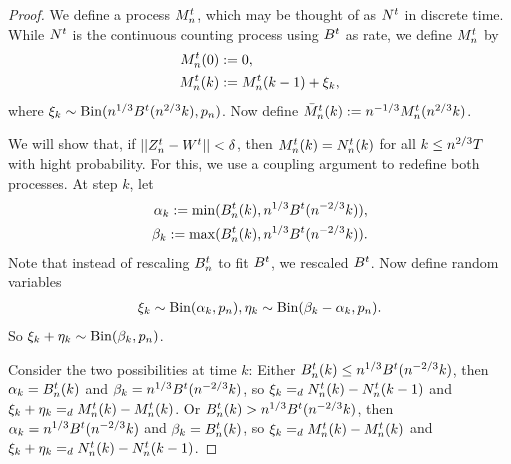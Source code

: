 \begin{proof}
We define a process $M_n^t$, which may be thought of as $N^t$ in discrete time.
While $N^t$ is the continuous counting process using $B^t$ as rate,
we define $M_n^t$ by
\begin{equation}
\begin{aligned}
M_n^t(0) &:= 0, \\
M_n^t(k) &:= M_n^t(k-1) + \xi_k, 
\end{aligned}
\end{equation}
where $\xi_k \sim \operatorname*{Bin}(n^{1 / 3}B^t(n^{2 / 3}k), p_n)$.
Now define $\bar{M}_n^t(k) := n^{-1 / 3} M_n^t(n^{2 / 3}k)$.

We will show that, if $||Z_n^t - W^t|| < \delta$, 
then $M_n^t(k) = N_n^t(k)$ for all $k \leq n^{2 / 3}T$ with hight probability.
For this, we use a coupling argument to redefine both processes.
At step $k$, let
\begin{equation}
\begin{aligned}
\alpha_k := \min(B_n^t(k), n^{1 / 3}B^t(n^{-2 / 3}k)), \\
\beta_k := \max(B_n^t(k), n^{1 / 3}B^t(n^{-2 / 3}k)).
\end{aligned}
\end{equation}
Note that instead of rescaling $B_n^t$ to fit $B^t$, we rescaled $B^t$.
Now define random variables
\begin{equation}
\begin{aligned}
\xi_k \sim \operatorname*{Bin}(\alpha_k, p_n),
\eta_k \sim \operatorname*{Bin}(\beta_k - \alpha_k, p_n).
\end{aligned}
\end{equation}
So $\xi_k + \eta_k \sim \operatorname*{Bin}(\beta_k, p_n)$.

Consider the two possibilities at time $k$:
Either $B_n^t(k) \leq n^{1 / 3}B^t(n^{-2 / 3}k)$,
then $\alpha_k = B_n^t(k)$ and $\beta_k = n^{1 / 3}B^t(n^{-2 / 3}k)$, 
so $\xi_k =_d N_n^t(k) - N_n^t(k-1)$ and $\xi_k + \eta_k =_d M_n^t(k) - M_n^t(k)$.
Or $B_n^t(k) > n^{1 / 3}B^t(n^{-2 / 3}k)$,
then $\alpha_k = n^{1 / 3}B^t(n^{-2 / 3}k)$ and $\beta_k = B_n^t(k)$, 
so $\xi_k =_d M_n^t(k) - M_n^t(k)$ and $\xi_k + \eta_k =_d N_n^t(k) - N_n^t(k-1)$.


\end{proof}
